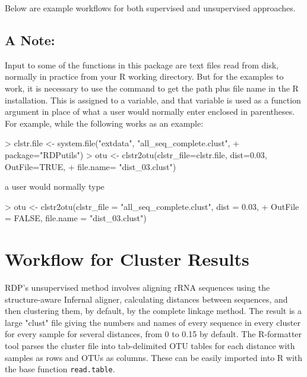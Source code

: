 \documentclass{article}
\begin{document}
Below are example workflows for both supervised and unsupervised approaches.
\subsection*{A Note:}
Input to some of the functions in this package are text files read from disk, normally in practice from your R working directory.  But for the examples to work, it is necessary to use the  command to get the path plus file name in the R installation.   This is assigned to a variable, and that variable is used as a function argument in place of what a user would normally enter enclosed in parentheses.  For example, while the following works as an example:
\begin{Schunk}
\begin{Sinput}
> clstr.file <- system.file("extdata", "all_seq_complete.clust",
+                           package="RDPutils")
> otu <- clstr2otu(clstr_file=clstr.file, dist=0.03, OutFile=TRUE,
+                  file.name= "dist_03.clust")
\end{Sinput}
\end{Schunk}
a user would normally type
\begin{Schunk}
\begin{Sinput}
> otu <- clstr2otu(clstr_file = "all_seq_complete.clust", dist = 0.03,
+                  OutFile = FALSE, file.name = "dist_03.clust")
\end{Sinput}
\end{Schunk}
\section*{Workflow for Cluster Results}
RDP's unsupervised method involves aligning rRNA sequences using the structure-aware Infernal aligner, calculating distances between sequences, and then clustering them, by default, by the complete linkage method.  The result is a large "clust" file giving the numbers and names of every sequence in every cluster for every sample for several distances, from 0 to 0.15 by default. The R-formatter tool parses the cluster file into tab-delimited OTU tables for each distance with samples as rows and OTUs as columns.  These can be easily imported into R with the base function \texttt{read.table}.
\end{document}
